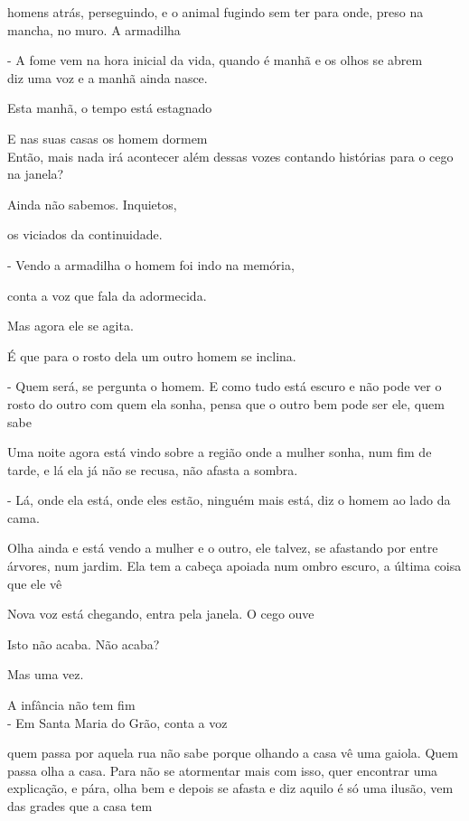 homens atrás, perseguindo, e o animal fugindo sem ter para onde, preso
na mancha, no muro. A armadilha

\pagebreak

- A fome vem na hora inicial da vida, quando é manhã e os olhos se abrem\\

diz uma voz e a manhã ainda nasce.

Esta manhã, o tempo está estagnado

E nas suas casas os homem dormem\\

Então, mais nada irá acontecer além dessas vozes contando histórias para
o cego na janela?

Ainda não sabemos. Inquietos,

os viciados da continuidade.

\pagebreak

- Vendo a armadilha o homem foi indo na memória,

conta a voz que fala da adormecida.

Mas agora ele se agita.

É que para o rosto dela um outro homem se inclina.

- Quem será, se pergunta o homem. E como tudo está escuro e não pode ver
o rosto do outro com quem ela sonha, pensa que o outro bem pode ser ele,
quem sabe

Uma noite agora está vindo sobre a região onde a mulher sonha, num fim
de tarde, e lá ela já não se recusa, não afasta a sombra.

- Lá, onde ela está, onde eles estão, ninguém mais está, diz o homem ao
lado da cama.

Olha ainda e está vendo a mulher e o outro, ele talvez, se afastando por
entre árvores, num jardim. Ela tem a cabeça apoiada num ombro escuro, a
última coisa que ele vê

\pagebreak

Nova voz está chegando, entra pela janela. O cego ouve

Isto não acaba. Não acaba?

Mas uma vez.

A infância não tem fim\\

- Em Santa Maria do Grão, conta a voz

quem passa por aquela rua não sabe porque olhando a casa vê uma gaiola.
Quem passa olha a casa. Para não se atormentar mais com isso, quer
encontrar uma explicação, e pára, olha bem e depois se afasta e diz
aquilo é só uma ilusão, vem das grades que a casa tem

